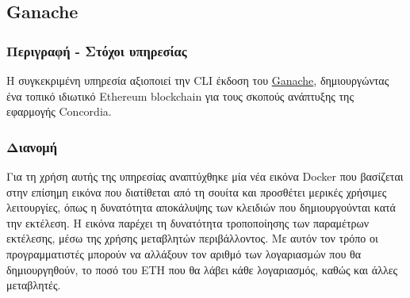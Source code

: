 \subsection{Ganache} \label{subsection:4-3-6-ganache-service}

\subsubsection{Περιγραφή - Στόχοι υπηρεσίας}

Η συγκεκριμένη υπηρεσία αξιοποιεί την CLI έκδοση του \hyperref[subsection:4-2-3-2-ganache]{Ganache}, δημιουργώντας ένα τοπικό ιδιωτικό Ethereum blockchain για τους σκοπούς ανάπτυξης της εφαρμογής Concordia.

\subsubsection{Διανομή}

Για τη χρήση αυτής της υπηρεσίας αναπτύχθηκε μία νέα εικόνα Docker που βασίζεται στην επίσημη εικόνα που διατίθεται από τη σουίτα και προσθέτει μερικές χρήσιμες λειτουργίες, όπως η δυνατότητα αποκάλυψης των κλειδιών που δημιουργούνται κατά την εκτέλεση. Η εικόνα παρέχει τη δυνατότητα τροποποίησης των παραμέτρων εκτέλεσης, μέσω της χρήσης μεταβλητών περιβάλλοντος. Με αυτόν τον τρόπο οι προγραμματιστές μπορούν να αλλάξουν τον αριθμό των λογαριασμών που θα δημιουργηθούν, το ποσό του ETH που θα λάβει κάθε λογαριασμός, καθώς και άλλες μεταβλητές.